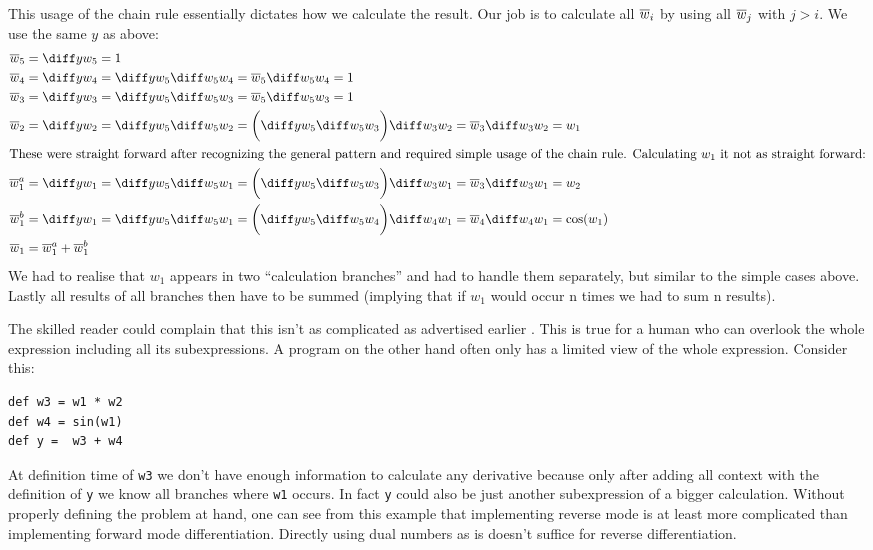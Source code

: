This usage of the chain rule essentially dictates how we calculate the result. Our job is to calculate all $\overline{w}_{i}$ by using all $\overline{w}_{j}$ with $j > i$.  We use the same $y$ as above:
\yExampleDiff
\begin{align*}
    \overw{5}   & = \diffyw{5} = 1                                                                                                           \\
    \overw{4}   & = \diffyw{4} = \diffyw{5}\diffw{5}{4} = \overw{5}\diffw{5}{4} = 1                                                          \\
    \overw{3}   & = \diffyw{3} = \diffyw{5}\diffw{5}{3} = \overw{5}\diffw{5}{3} = 1                                                          \\
    \overw{2}   & = \diffyw{2} = \diffyw{5}\diffw{5}{2} = \bigg(\diffyw{5}\diffw{5}{3}\bigg)\diffw{3}{2} = \overw{3}\diffw{3}{2} = w_1       \\
    \intertext{These were straight forward after recognizing the general pattern and required simple usage of the chain rule. Calculating $w_1$ it not as straight forward:}
    \overw{1}^a & = \diffyw{1} = \diffyw{5}\diffw{5}{1} = \bigg(\diffyw{5}\diffw{5}{3}\bigg)\diffw{3}{1} = \overw{3}\diffw{3}{1} = w_2       \\
    \overw{1}^b & = \diffyw{1} = \diffyw{5}\diffw{5}{1} = \bigg(\diffyw{5}\diffw{5}{4}\bigg)\diffw{4}{1} = \overw{4}\diffw{4}{1} = \cos(w_1) \\
    \overw{1}   & = \overw{1}^a + \overw{1}^b
\end{align*}
We had to realise that $w_1$ appears in two ``calculation branches'' and had to handle them separately, but similar to the simple cases above. Lastly all results of all branches then have to be summed (implying that if $w_1$ would occur n times we had to sum n results).

The skilled reader could complain that this isn't as complicated as advertised \todowording earlier . This is true for a human who can overlook the whole expression including all its subexpressions. A program on the other hand often only has a limited view of the whole expression. Consider this:
\begin{lstlisting}[label={lst:reverseProgramVsHuman}, caption={Limited context of a program opposed to a human}]
def w3 = w1 * w2
def w4 = sin(w1)
def y =  w3 + w4
\end{lstlisting}
At definition time of \lstinline{w3} we don't have enough information to calculate any derivative because only after adding all context with the definition of \lstinline{y} we know all branches where \lstinline{w1} occurs. In fact \lstinline{y} could also be just another subexpression of a bigger calculation. Without properly defining the problem at hand, one can see from this example that implementing reverse mode is at least more complicated than implementing forward mode differentiation. \todowording Directly using dual numbers as is doesn't suffice for reverse differentiation.

